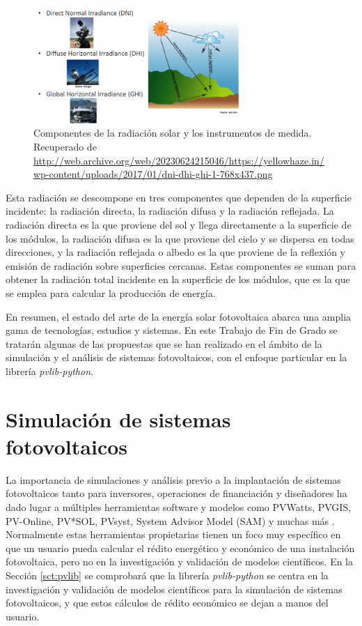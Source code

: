 \begin{figure}[H]
      \centering
      \includegraphics[width=0.7\textwidth]{./images/SoA_irrad/dni-dhi-ghi-1-768x437.png}
      \caption{Componentes de la radiación solar y los instrumentos de medida. Recuperado de \url{http://web.archive.org/web/20230624215046/https://yellowhaze.in/wp-content/uploads/2017/01/dni-dhi-ghi-1-768x437.png}}
      \label{fig:irrad_componentes}
\end{figure}

Esta radiación se descompone en tres componentes que dependen de la superficie incidente: la radiación directa, la radiación difusa y la radiación reflejada. La radiación directa es la que proviene del sol y llega directamente a la superficie de los módulos, la radiación difusa es la que proviene del cielo y se dispersa en todas direcciones, y la radiación reflejada o albedo es la que proviene de la reflexión y emisión de radiación sobre superficies cercanas. Estas componentes se suman para obtener la radiación total incidente en la superficie de los módulos, que es la que se emplea para calcular la producción de energía.

En resumen, el estado del arte de la energía solar fotovoltaica abarca una amplia gama de tecnologías, estudios y sistemas. En este Trabajo de Fin de Grado se tratarán algunas de las propuestas que se han realizado en el ámbito de la simulación y el análisis de sistemas fotovoltaicos, con el enfoque particular en la librería \textit{pvlib-python}.

\section{Simulación de sistemas fotovoltaicos} \label{sct:simulaciones}

La importancia de simulaciones y análisis previo a la implantación de sistemas fotovoltaicos tanto para inversores, operaciones de financiación y diseñadores ha dado lugar a múltiples herramientas software y modelos como PVWatts, PVGIS, PV-Online, PV*SOL, PVsyst, System Advisor Model (SAM) y muchas más \cite{stein_models_2009, Kumar_2017}. Normalmente estas herramientas propietarias tienen un foco muy específico en que un usuario pueda calcular el rédito energético y económico de una instalación fotovoltaica, pero no en la investigación y validación de modelos científicos. En la Sección \ref{sct:pvlib} se comprobará que la librería \textit{pvlib-python} se centra en la investigación y validación de modelos científicos para la simulación de sistemas fotovoltaicos, y que estos cálculos de rédito económico se dejan a manos del usuario.

